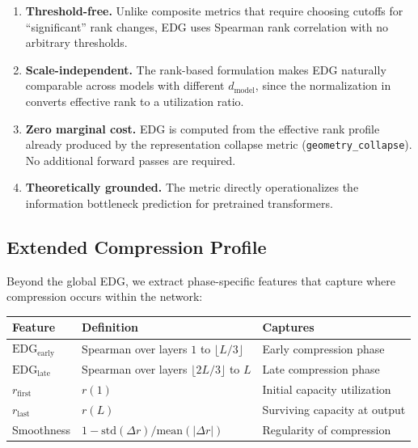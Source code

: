 \documentclass[preprint]{neurips_2025}
\begin{document}
\begin{enumerate}
  \item \textbf{Threshold-free.} Unlike composite metrics that require choosing cutoffs for ``significant'' rank changes, EDG uses Spearman rank correlation with no arbitrary thresholds.
  \item \textbf{Scale-independent.} The rank-based formulation makes EDG naturally comparable across models with different $d_{\text{model}}$, since the normalization in  converts effective rank to a utilization ratio.
  \item \textbf{Zero marginal cost.} EDG is computed from the effective rank profile already produced by the representation collapse metric (\texttt{geometry\_collapse}). No additional forward passes are required.
  \item \textbf{Theoretically grounded.} The metric directly operationalizes the information bottleneck prediction for pretrained transformers.
\end{enumerate}

\subsection{Extended Compression Profile}
\label{sec:edg-extended}

Beyond the global EDG, we extract phase-specific features that capture where compression occurs within the network:

\begin{table}[h]
\centering
\small
\begin{tabular}{@{}lll@{}}
\toprule
\textbf{Feature} & \textbf{Definition} & \textbf{Captures} \\
\midrule
$\text{EDG}_{\text{early}}$ & Spearman over layers $1$ to $\lfloor L/3 \rfloor$ & Early compression phase \\
$\text{EDG}_{\text{late}}$ & Spearman over layers $\lfloor 2L/3 \rfloor$ to $L$ & Late compression phase \\
$r_{\text{first}}$ & $r(1)$ & Initial capacity utilization \\
$r_{\text{last}}$ & $r(L)$ & Surviving capacity at output \\
Smoothness & $1 - \text{std}(\Delta r) / \text{mean}(|\Delta r|)$ & Regularity of compression \\
\bottomrule
\end{tabular}
\end{table}
\end{document}
